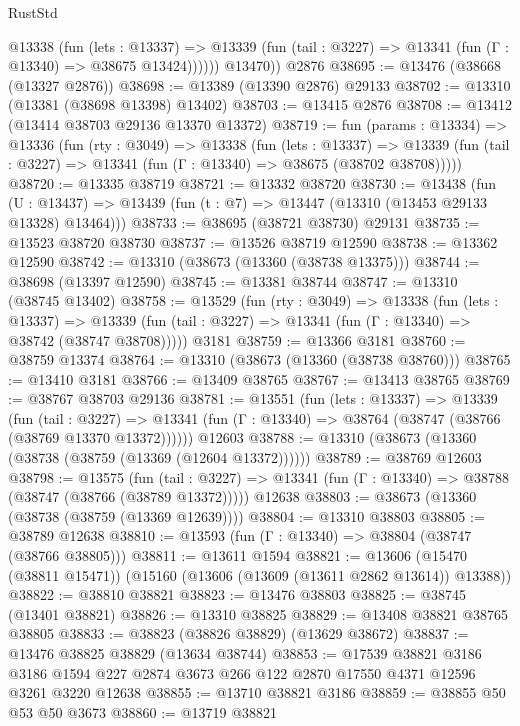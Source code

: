 \begin{lexlean}{RustStd}
\begin{coremodule}
            @13338
              (fun (lets : @13337) =>
              @13339 (fun (tail : @3227) => @13341 (fun (Γ : @13340) => @38675 @13424))))))
        @13470))
    @2876
@38695 := @13476 (@38668 (@13327 @2876))
@38698 := @13389 (@13390 @2876) @29133
@38702 := @13310 (@13381 (@38698 @13398) @13402)
@38703 := @13415 @2876
@38708 := @13412 (@13414 @38703 @29136 @13370 @13372)
@38719 := fun (params : @13334) =>
  @13336
    (fun (rty : @3049) =>
    @13338
      (fun (lets : @13337) =>
      @13339 (fun (tail : @3227) => @13341 (fun (Γ : @13340) => @38675 (@38702 @38708)))))
@38720 := @13335 @38719
@38721 := @13332 @38720
@38730 := @13438
    (fun (U : @13437) => @13439 (fun (t : @7) => @13447 (@13310 (@13453 @29133 @13328) @13464)))
@38733 := @38695 (@38721 @38730) @29131
@38735 := @13523 @38720 @38730
@38737 := @13526 @38719 @12590
@38738 := @13362 @12590
@38742 := @13310 (@38673 (@13360 (@38738 @13375)))
@38744 := @38698 (@13397 @12590)
@38745 := @13381 @38744
@38747 := @13310 (@38745 @13402)
@38758 := @13529
    (fun (rty : @3049) =>
    @13338
      (fun (lets : @13337) =>
      @13339 (fun (tail : @3227) => @13341 (fun (Γ : @13340) => @38742 (@38747 @38708)))))
    @3181
@38759 := @13366 @3181
@38760 := @38759 @13374
@38764 := @13310 (@38673 (@13360 (@38738 @38760)))
@38765 := @13410 @3181
@38766 := @13409 @38765
@38767 := @13413 @38765
@38769 := @38767 @38703 @29136
@38781 := @13551
    (fun (lets : @13337) =>
    @13339
      (fun (tail : @3227) =>
      @13341 (fun (Γ : @13340) => @38764 (@38747 (@38766 (@38769 @13370 @13372))))))
    @12603
@38788 := @13310 (@38673 (@13360 (@38738 (@38759 (@13369 (@12604 @13372))))))
@38789 := @38769 @12603
@38798 := @13575
    (fun (tail : @3227) => @13341 (fun (Γ : @13340) => @38788 (@38747 (@38766 (@38789 @13372)))))
    @12638
@38803 := @38673 (@13360 (@38738 (@38759 (@13369 @12639))))
@38804 := @13310 @38803
@38805 := @38789 @12638
@38810 := @13593 (fun (Γ : @13340) => @38804 (@38747 (@38766 @38805)))
@38811 := @13611 @1594
@38821 := @13606 (@15470 (@38811 @15471)) (@15160 (@13606 (@13609 (@13611 @2862 @13614)) @13388))
@38822 := @38810 @38821
@38823 := @13476 @38803
@38825 := @38745 (@13401 @38821)
@38826 := @13310 @38825
@38829 := @13408 @38821 @38765 @38805
@38833 := @38823 (@38826 @38829) (@13629 @38672)
@38837 := @13476 @38825 @38829 (@13634 @38744)
@38853 := @17539
    @38821
    @3186
    @3186
    @1594
    @227
    @2874
    @3673
    @266
    @122
    @2870
    @17550
    @4371
    @12596
    @3261
    @3220
    @12638
@38855 := @13710 @38821 @3186
@38859 := @38855 @50 @53 @50 @3673
@38860 := @13719 @38821

\end{coremodule}
\end{lexlean}
